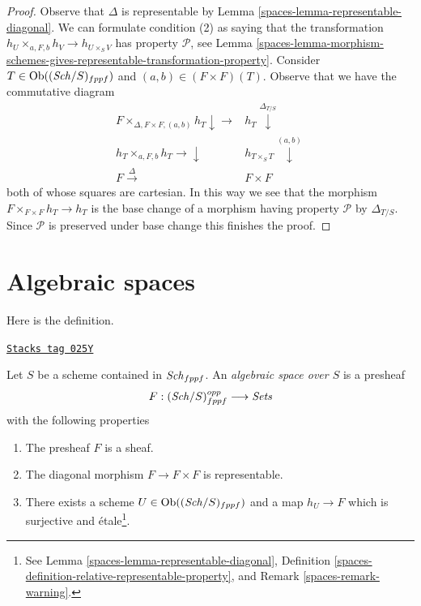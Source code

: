 \begin{proof}

Observe that $\Delta$ is representable by
Lemma \ref{spaces-lemma-representable-diagonal}.
We can formulate condition (2) as saying that
the transformation $h_U \times_{a, F, b} h_V \to h_{U \times_S V}$
has property $\mathcal{P}$, see Lemma
\ref{spaces-lemma-morphism-schemes-gives-representable-transformation-property}.
Consider $T \in \operatorname{Ob}((\mathit{Sch}/S)_{fppf})$ and $(a, b) \in (F \times F)(T)$.
Observe that we have the commutative diagram
$$
\begin{array}{cc}F \times_{\Delta, F \times F, (a, b)} h_T \downarrow\longrightarrow & h_T \overset{\Delta_{T/S}}{\downarrow} \\ h_T \times_{a, F, b} h_T \longrightarrow\downarrow & h_{T \times_S T} \overset{(a, b)}{\downarrow} \\ F \overset{\Delta}{\longrightarrow} & F \times F\end{array}
$$
both of whose squares are cartesian. In this way we see that
the morphism $F \times_{F \times F} h_T \to h_T$ is the base
change of a morphism having property $\mathcal{P}$ by
$\Delta_{T/S}$. Since $\mathcal{P}$ is preserved under base
change this finishes the proof.
\end{proof}

\section{Algebraic spaces}
\label{spaces-section-algebraic-spaces}
Here is the definition.

\begin{definition}
\label{spaces-definition-algebraic-space}
\href{https://stacks.math.columbia.edu/tag/025Y}{\texttt{Stacks tag 025Y}}

Let $S$ be a scheme contained in $\mathit{Sch}_{fppf}$.
An {\it algebraic space over $S$} is a presheaf
$$
F : (\mathit{Sch}/S)^{opp}_{fppf} \longrightarrow \textit{Sets}
$$
with the following properties
\begin{enumerate}
\item The presheaf $F$ is a sheaf.
\item The diagonal morphism $F  \to F \times F$ is representable.
\item There exists a scheme $U \in \operatorname{Ob}((\mathit{Sch}/S)_{fppf})$
and a map $h_U \to F$ which is surjective and \'etale\footnote{See
Lemma \ref{spaces-lemma-representable-diagonal},
Definition \ref{spaces-definition-relative-representable-property}, and
Remark \ref{spaces-remark-warning}.}.
\end{enumerate}
\end{definition}

